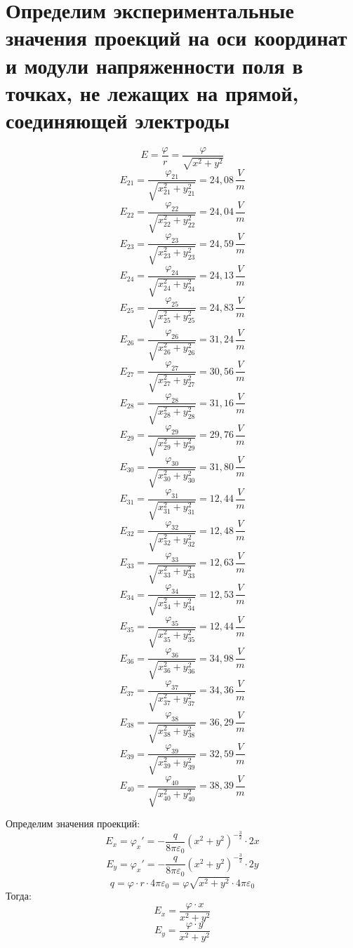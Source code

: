 \documentclass[a4paper,12pt]{report}
\begin{document}
\section*{Определим экспериментальные значения проекций на оси координат и модули напряженности поля в точках, не лежащих на прямой, соединяющей электроды}

\[ E = \frac{\varphi}{r} = \frac{\varphi}{\sqrt{x^2+y^2}} \]
\[ E_{21} = \frac{\varphi_{21}}{\sqrt{x_{21}^2+y_{21}^2}} = 24,08 \, \frac{V}{m} \]
\[ E_{22} = \frac{\varphi_{22}}{\sqrt{x_{22}^2+y_{22}^2}} = 24,04 \, \frac{V}{m} \]
\[ E_{23} = \frac{\varphi_{23}}{\sqrt{x_{23}^2+y_{23}^2}} = 24,59 \, \frac{V}{m} \]
\[ E_{24} = \frac{\varphi_{24}}{\sqrt{x_{24}^2+y_{24}^2}} = 24,13 \, \frac{V}{m} \]
\[ E_{25} = \frac{\varphi_{25}}{\sqrt{x_{25}^2+y_{25}^2}} = 24,83 \, \frac{V}{m} \]
\[ E_{26} = \frac{\varphi_{26}}{\sqrt{x_{26}^2+y_{26}^2}} = 31,24 \, \frac{V}{m} \]
\[ E_{27} = \frac{\varphi_{27}}{\sqrt{x_{27}^2+y_{27}^2}} = 30,56 \, \frac{V}{m} \]
\[ E_{28} = \frac{\varphi_{28}}{\sqrt{x_{28}^2+y_{28}^2}} = 31,16 \, \frac{V}{m} \]
\[ E_{29} = \frac{\varphi_{29}}{\sqrt{x_{29}^2+y_{29}^2}} = 29,76 \, \frac{V}{m} \]
\[ E_{30} = \frac{\varphi_{30}}{\sqrt{x_{30}^2+y_{30}^2}} = 31,80 \, \frac{V}{m} \]
\[ E_{31} = \frac{\varphi_{31}}{\sqrt{x_{31}^2+y_{31}^2}} = 12,44 \, \frac{V}{m} \]
\[ E_{32} = \frac{\varphi_{32}}{\sqrt{x_{32}^2+y_{32}^2}} = 12,48 \, \frac{V}{m} \]
\[ E_{33} = \frac{\varphi_{33}}{\sqrt{x_{33}^2+y_{33}^2}} = 12,63 \, \frac{V}{m} \]
\[ E_{34} = \frac{\varphi_{34}}{\sqrt{x_{34}^2+y_{34}^2}} = 12,53 \, \frac{V}{m} \]
\[ E_{35} = \frac{\varphi_{35}}{\sqrt{x_{35}^2+y_{35}^2}} = 12,44 \, \frac{V}{m} \]
\[ E_{36} = \frac{\varphi_{36}}{\sqrt{x_{36}^2+y_{36}^2}} = 34,98 \, \frac{V}{m} \]
\[ E_{37} = \frac{\varphi_{37}}{\sqrt{x_{37}^2+y_{37}^2}} = 34,36 \, \frac{V}{m} \]
\[ E_{38} = \frac{\varphi_{38}}{\sqrt{x_{38}^2+y_{38}^2}} = 36,29 \, \frac{V}{m} \]
\[ E_{39} = \frac{\varphi_{39}}{\sqrt{x_{39}^2+y_{39}^2}} = 32,59\, \frac{V}{m} \]
\[ E_{40} = \frac{\varphi_{40}}{\sqrt{x_{40}^2+y_{40}^2}} = 38,39 \, \frac{V}{m} \]

Определим значения проекций:
\[ E_x = \varphi_x' = -\frac{q}{8\pi\varepsilon_0}(x^2+y^2)^{-\frac{3}{2}}\cdot 2x \]
\[ E_y = \varphi_x' = -\frac{q}{8\pi\varepsilon_0}(x^2+y^2)^{-\frac{3}{2}}\cdot 2y \]
\[ q = \varphi\cdot r \cdot 4\pi \varepsilon_0 = \varphi \sqrt{x^2+y^2}\cdot 4\pi \varepsilon_0 \]
Тогда:
\[ E_x = \frac{\varphi\cdot x}{x^2+y^2} \]
\[ E_y = \frac{\varphi\cdot y}{x^2+y^2} \]
\end{document}
